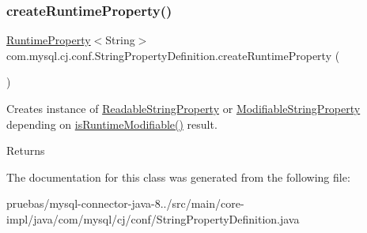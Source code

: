 \subsubsection{\texorpdfstring{create\+Runtime\+Property()}{createRuntimeProperty()}}
{\footnotesize\ttfamily \mbox{\hyperlink{interfacecom_1_1mysql_1_1cj_1_1conf_1_1_runtime_property}{Runtime\+Property}}$<$String$>$ com.\+mysql.\+cj.\+conf.\+String\+Property\+Definition.\+create\+Runtime\+Property (\begin{DoxyParamCaption}{ }\end{DoxyParamCaption})}

Creates instance of \mbox{\hyperlink{classcom_1_1mysql_1_1cj_1_1conf_1_1_readable_string_property}{Readable\+String\+Property}} or \mbox{\hyperlink{classcom_1_1mysql_1_1cj_1_1conf_1_1_modifiable_string_property}{Modifiable\+String\+Property}} depending on \mbox{\hyperlink{classcom_1_1mysql_1_1cj_1_1conf_1_1_abstract_property_definition_a6c98140b2db84ccd0ff29ce165ec9ef5}{is\+Runtime\+Modifiable()}} result.

\begin{DoxyReturn}{Returns}

\end{DoxyReturn}


The documentation for this class was generated from the following file\+:\begin{DoxyCompactItemize}
\item 
pruebas/mysql-\/connector-\/java-\/8../src/main/core-\/impl/java/com/mysql/cj/conf/String\+Property\+Definition.\+java\end{DoxyCompactItemize}
